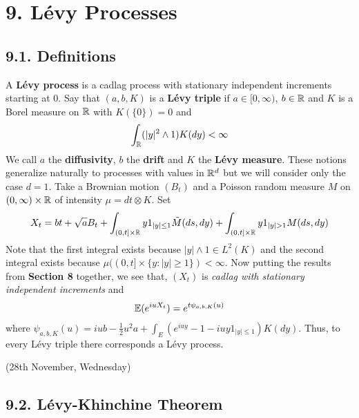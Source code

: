 \documentclass[12pt,a4paper]{report}
\begin{document}
\section*{9. L\'{e}vy Processes}

\subsection*{9.1. Definitions}

A \textbf{L\'{e}vy process} is a cadlag process with stationary independent increments starting at 0. Say that $(a,b,K)$ is a \textbf{L\'{e}vy triple} if $a\in [0,\infty)$, $b\in \mathbb{R}$ and $K$ is a Borel measure on $\mathbb{R}$ with $K(\{0\}) =0$ and
\begin{align*}
\int_{\mathbb{R}} (|y|^2 \wedge 1) K(dy) < \infty
\end{align*}
We call $a$ the \textbf{diffusivity}, $b$ the \textbf{drift} and $K$ the \textbf{L\'{e}vy measure}. These notions generalize naturally to processes with values in $\mathbb{R}^d$ but we will consider only the case $d = 1$. Take a Brownian motion $(B_t)$ and a Poisson random measure $M$ on $(0,\infty) \times \mathbb{R}$ of intensity $\mu = dt \otimes K$. Set
\begin{align*}
X_t = bt + \sqrt{a} B_t +\int_{(0,t]\times \reals} y1_{|y| \leq 1} \tilde{M}(ds,dy) + \int_{(0,t] \times \reals} y1_{|y|>1} M(ds,dy)
\end{align*}
Note that the first integral exists because $|y|\wedge 1 \in L^2(K)$ and the second integral exists because $\mu((0,t] \times \{y: |y|\geq 1\}   ) < \infty$. Now putting the results from \textbf{Section 8} together, we see that, $(X_t)$ is \emph{cadlag with stationary independent increments} and
\begin{align*}
\mathbb{E}(e^{iu X_t}) = e^{t\psi_{a,b,K}(u)}
\end{align*}
where $\psi_{a,b,K}(u) = iub - \frac{1}{2}u^2a  + \int_E (e^{iuy} - 1 - iuy1_{|y|\leq 1}) K(dy)$. Thus, to every L\'{e}vy triple there corresponds a L\'{e}vy process.
\s

\newday

(28th November, Wednesday)

\subsection*{9.2. L\'{e}vy-Khinchine Theorem}
\end{document}
